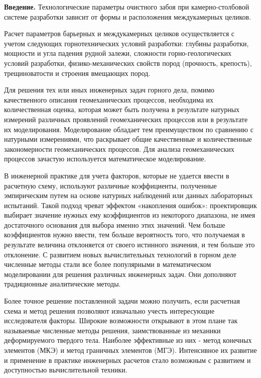 \begin{multicols}{2}
{\bfseries Введение.} Технологические параметры очистного забоя при
камерно-столбовой системе разработки зависит от формы и расположения
междукамерных целиков.

Расчет параметров барьерных и междукамерных целиков осуществляется с
учетом следующих горнотехнических условий разработки: глубины
разработки, мощности и угла падения рудной залежи, сложности
горно-геологических условий разработки, физико-механических свойств
пород (прочность, крепость), трещиноватости и строения вмещающих пород.

Для решения тех или иных инженерных задач горного дела, помимо
качественного описания геомеханических процессов, необходима их
количественная оценка, которая может быть получена в результате натурных
измерений различных проявлений геомеханических процессов или в
результате их моделирования. Моделирование обладает тем преимуществом по
сравнению с натурными измерениями, что раскрывает общие качественные и
количественные закономерности геомеханических процессов. Для анализа
геомеханических процессов зачастую используется математическое
моделирование.

В инженерной практике для учета факторов, которые не удается ввести в
расчетную схему, используют различные коэффициенты, полученные
эмпирическим путем на основе натурных наблюдений или данных лабораторных
испытаний. Такой подход чреват эффектом «накопления ошибок»:
проектировщик выбирает значение нужных ему коэффициентов из некоторого
диапазона, не имея достаточного основания для выбора именно этих
значений. Чем больше коэффициентов нужно ввести, тем больше вероятность
того, что получаемая в результате величина отклоняется от своего
истинного значения, и тем больше это отклонение. С развитием новых
вычислительных технологий в горном деле численные методы стали все более
популярными в математическом моделировании для решения различных
инженерных задач. Они дополняют традиционные аналитические методы.

Более точное решение поставленной задачи можно получить, если расчетная
схема и метод решения позволяют изначально учесть интересующие
исследователя факторы. Широкие возможности открывают в этом плане так
называемые численные методы решения, заимствованные из механики
деформируемого твердого тела. Наиболее эффективные из них - метод
конечных элементов (МКЭ) и метод граничных элементов (МГЭ). Интенсивное
их развитие и применение в практике инженерных расчетов стало возможным
с развитием и доступностью вычислительной техники.


\end{multicols}
